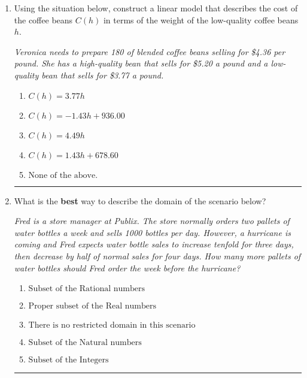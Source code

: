 \documentclass[14pt]{extbook}
\newcommand{\litem}[1]{\item#1\hspace*{-1cm}\rule{\textwidth}{0.4pt}}
\begin{document}
\begin{enumerate}
{\begin{enumerate}[label=\Alph*.]
\end{enumerate} }
\litem{
Using the situation below, construct a linear model that describes the cost of the coffee beans $C(h)$ in terms of the weight of the low-quality coffee beans $h$.
\begin{center}
    \textit{ Veronica needs to prepare 180 of blended coffee beans selling for \$4.36 per pound. She has a high-quality bean that sells for \$5.20 a pound and a low-quality bean that sells for \$3.77 a pound. }
\end{center}
\begin{enumerate}[label=\Alph*.]
\item \( C(h) = 3.77 h \)
\item \( C(h) = -1.43 h + 936.00 \)
\item \( C(h) = 4.49 h \)
\item \( C(h) = 1.43 h + 678.60 \)
\item \( \text{None of the above.} \)

\end{enumerate} }
\litem{
What is the \textbf{best} way to describe the domain of the scenario below?
\begin{center}
    \textit{ Fred is a store manager at Publix. The store normally orders two pallets of water bottles a week and sells 1000 bottles per day. However, a hurricane is coming and Fred expects water bottle sales to increase tenfold for three days, then decrease by half of normal sales for four days. How many more pallets of water bottles should Fred order the week before the hurricane? }
\end{center}
\begin{enumerate}[label=\Alph*.]
\item \( \text{Subset of the Rational numbers} \)
\item \( \text{Proper subset of the Real numbers} \)
\item \( \text{There is no restricted domain in this scenario} \)
\item \( \text{Subset of the Natural numbers} \)
\item \( \text{Subset of the Integers} \)


\end{enumerate}}
\end{enumerate}
\end{document}

